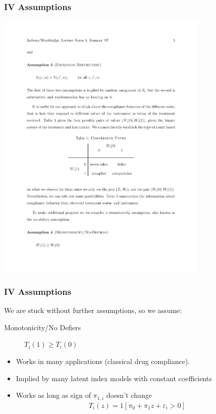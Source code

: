 \documentclass[xcolor=pdftex,dvipsnames,table,mathserif]{beamer}
\begin{document}
\begin{frame}
\frametitle{IV Assumptions}
\includegraphics[width=4in]{./resources/imbens1.pdf}
\end{frame}



\begin{frame}
\frametitle{IV Assumptions}
We are stuck without further assumptions, so we assume:
\begin{description}
\item [Monotonicity/No Defiers] $T_i(1) \geq T_i(0)$
\end{description}
\begin{itemize}
\item Works in many applications (classical drug compliance).
\item Implied by many latent index models with constant coefficients
\item Works as long as sign of $\pi_{1,i}$ doesn't change
\begin{eqnarray*}
T_i(z)  = 1 [\pi_0 + \pi_1 z + \varepsilon_i > 0]
\end{eqnarray*}
\end{itemize}
\end{frame}
\end{document}
